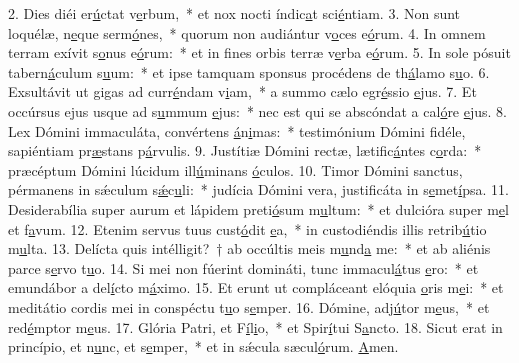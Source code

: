 2. Dies diéi er\uline{ú}ctat v\uline{e}rbum,~* et nox nocti índic\uline{a}t sci\uline{é}ntiam.
3. Non sunt loquélæ, n\uline{e}que serm\uline{ó}nes,~* quorum non audiántur v\uline{o}ces e\uline{ó}rum.
4. In omnem terram exívit s\uline{o}nus e\uline{ó}rum:~* et in fines orbis terræ v\uline{e}rba e\uline{ó}rum.
5. In sole pósuit tabern\uline{á}culum s\uline{u}um:~* et ipse tamquam sponsus procédens de th\uline{á}lamo s\uline{u}o.
6. Exsultávit ut gigas ad curr\uline{é}ndam v\uline{i}am,~* a summo cælo egr\uline{é}ssio \uline{e}jus.
7. Et occúrsus ejus usque ad s\uline{u}mmum \uline{e}jus:~* nec est qui se abscóndat a cal\uline{ó}re \uline{e}jus.
8. Lex Dómini immaculáta, convértens \uline{á}n\uline{i}mas:~* testimónium Dómini fidéle, sapiéntiam pr\uline{æ}stans p\uline{á}rvulis.
9. Justítiæ Dómini rectæ, lætific\uline{á}ntes c\uline{o}rda:~* præcéptum Dómini lúcidum ill\uline{ú}minans \uline{ó}culos.
10. Timor Dómini sanctus, pérmanens in sǽculum s\uline{ǽ}c\uline{u}li:~* judícia Dómini vera, justificáta in s\uline{e}met\uline{í}psa.
11. Desiderabília super aurum et lápidem preti\uline{ó}sum m\uline{u}ltum:~* et dulcióra super m\uline{e}l et f\uline{a}vum.
12. Etenim servus tuus cust\uline{ó}dit \uline{e}a,~* in custodiéndis illis retrib\uline{ú}tio m\uline{u}lta.
13. Delícta quis intélligit?~† ab occúltis meis m\uline{u}nd\uline{a} me:~* et ab aliénis parce s\uline{e}rvo t\uline{u}o.
14. Si mei non fúerint domináti, tunc immacul\uline{á}tus \uline{e}ro:~* et emundábor a del\uline{í}cto m\uline{á}ximo.
15. Et erunt ut compláceant elóquia \uline{o}ris m\uline{e}i:~* et meditátio cordis mei in conspéctu t\uline{u}o s\uline{e}mper.
16. Dómine, adj\uline{ú}tor m\uline{e}us,~* et red\uline{é}mptor m\uline{e}us.
17. Glória Patri, et F\uline{í}l\uline{i}o,~* et Spir\uline{í}tui S\uline{a}ncto.
18. Sicut erat in princípio, et n\uline{u}nc, et s\uline{e}mper,~* et in sǽcula sæcul\uline{ó}rum. \uline{A}men.
